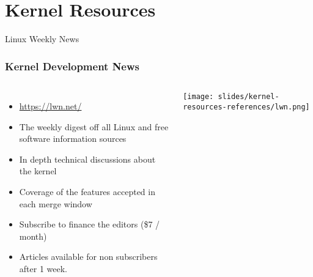 \section{Kernel Resources}

\begin{frame}
  Linux Weekly News
  \frametitle{Kernel Development News}
  \begin{columns}
    \begin{itemize}
    \item \url{https://lwn.net/}
    \item The weekly digest off all Linux and free software
      information sources
    \item In depth technical discussions about the kernel
    \item Coverage of the features accepted in each merge window
    \item Subscribe to finance the editors (\$7 / month)
    \item Articles available for non subscribers after 1 week.
    \end{itemize}
    \texttt{[image: slides/kernel-resources-references/lwn.png]}
  \end{columns}
\end{frame}

